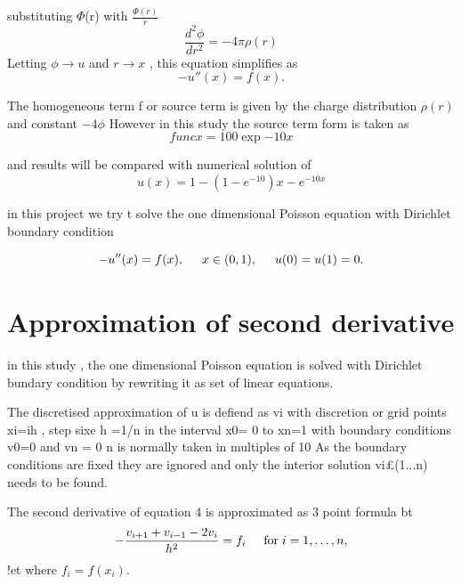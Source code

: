 \documentclass{article}
\begin{document}
substituting  $\Phi$(r) with $\frac{\Phi(r)}{r}$
\begin{equation}
\frac{d^2\phi}{dr^2}= -4\pi\rho(r)
\end{equation}
Letting $\phi\rightarrow u$  and $r\rightarrow x$ , this equation simplifies as
\begin{equation}
-u''(x) = f(x).
\end{equation}


The homogeneous term f or source term is given by the charge distribution $\rho(r)$ and constant $-4\phi$
However in this study the source term form is taken as 
\begin{equation}
func{x}=100\exp{-10x}
\end{equation}

and results will be compared with numerical solution of 
\begin{equation}
u(x) = 1-(1-e^{-10})x-e^{-10x}
\end{equation}

in this project we try t solve the one dimensional Poisson equation with Dirichlet boundary condition 

\begin{equation}
-u''(x) = f(x), \hspace{0.5cm} x\in(0,1), \hspace{0.5cm} u(0) = u(1) = 0.
\end{equation}


\section{Approximation of second derivative}

in this study , the one dimensional Poisson equation is solved with Dirichlet bundary condition by rewriting it as set of linear equations.

The discretised approximation of u is defiend as vi with discretion or grid points 
xi=ih , step sixe h =1/n in the interval x0= 0 to xn=1 with boundary conditions v0=0 and vn = 0
n is normally taken in multiples of 10 
As the boundary conditions are fixed they are ignored and only the interior solution vi£(1...n) needs to be found.

The second derivative of equation 4 is approximated as 3 point formula
bt
\begin{equation}
   -\frac{v_{i+1}+v_{i-1}-2v_i}{h^2} = f_i  \hspace{0.5cm} \mathrm{for} \hspace{0.1cm} i=1,\dots, n,
\end{equation}
!et
where $f_i=f(x_i)$.
\end{document}

